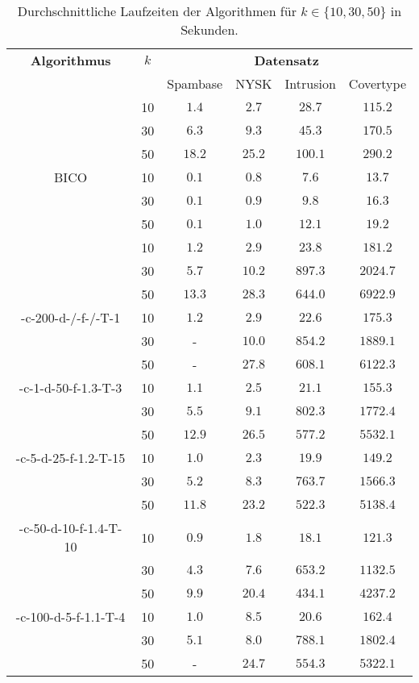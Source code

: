 \begin{table}[h]
\centering
\begin{tabular}{@{}cccccc@{}} \toprule
	\textbf{Algorithmus} & $k$ & \multicolumn{4}{c}{\textbf{Datensatz}} \\
	\cmidrule(r){3-6} & 		& Spambase 				& NYSK 				& Intrusion 			& Covertype \\ \toprule
	\Skmpp 						& 10 & $1.4$ 			& $2.7$ 			& $28.7$ 				& $115.2$ \\
		 						& 30 & $6.3$ 			& $9.3$ 			& $45.3$ 				& $170.5$ \\
		 						& 50 & $18.2$ 			& $25.2$ 			& $100.1$ 				& $290.2$ \\
	\midrule
	BICO 						& 10 & $0.1$ 			& $0.8$ 			& $7.6$ 				& $13.7$ \\
			 					& 30 & $0.1$ 			& $0.9$ 			& $9.8$ 				& $16.3$ \\
		 						& 50 & $0.1$ 			& $1.0$ 			& $12.1$ 				& $19.2$ \\
	\midrule
	\kmpp 						& 10 & $1.2$ 			& $2.9$ 			& $23.8$ 				& $181.2$ \\
			 					& 30 & $5.7$ 			& $10.2$ 			& $897.3$ 				& $2024.7$ \\
		 						& 50 & $13.3$ 			& $28.3$ 			& $644.0$ 				& $6922.9$ \\
	\midrule
	\CsTwo-c-200-d-/-f-/-T-1	& 10 & $1.2$			& $2.9$				& $22.6$ 				& $175.3$ \\
			 					& 30 & - 				& $10.0$			& $854.2$ 				& $1889.1$ \\
		 						& 50 & - 				& $27.8$			& $608.1$ 				& $6122.3$ \\
	\midrule
	\CsTwo-c-1-d-50-f-1.3-T-3	& 10 & $1.1$ 			& $2.5$ 			& $21.1$ 				& $155.3$ \\
			 					& 30 & $5.5$ 			& $9.1$ 			& $802.3$ 				& $1772.4$ \\
		 						& 50 & $12.9$ 			& $26.5$ 			& $577.2$ 				& $5532.1$ \\
	\midrule
	\CsTwo-c-5-d-25-f-1.2-T-15	& 10 & $1.0$ 			& $2.3$ 			& $19.9$ 				& $149.2$ \\
			 					& 30 & $5.2$ 			& $8.3$ 			& $763.7$ 				& $1566.3$ \\
		 						& 50 & $11.8$ 			& $23.2$ 			& $522.3$ 				& $5138.4$ \\
	\midrule
	\CsTwo-c-50-d-10-f-1.4-T-10	& 10 & $0.9$ 			& $1.8$ 			& $18.1$ 				& $121.3$ \\
			 					& 30 & $4.3$ 			& $7.6$ 			& $653.2$ 				& $1132.5$ \\
		 						& 50 & $9.9$ 			& $20.4$ 			& $434.1$ 				& $4237.2$ \\
	\midrule
	\CsTwo-c-100-d-5-f-1.1-T-4	& 10 & $1.0$ 			& $8.5$ 			& $20.6$ 				& $162.4$ \\
			 					& 30 & $5.1$ 			& $8.0$				& $788.1$ 				& $1802.4$ \\
		 						& 50 & - 				& $24.7$ 			& $554.3$ 				& $5322.1$ \\
	\bottomrule
\end{tabular}
\caption{Durchschnittliche Laufzeiten der Algorithmen für $k \in \{ 10, 30, 50 \}$ in Sekunden.}
\label{tbl:experiment-coresets-runtime}
\end{table}
